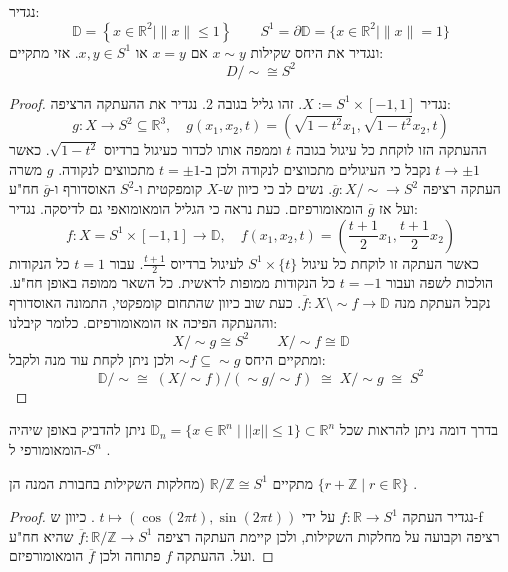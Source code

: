 \documentclass{tstextbook}
\begin{document}
\begin{example}
נגדיר:
$$\mathbb{D}=\left\{ x\in\mathbb{R}^{2}\mid\|x\|\le1 \right\}\qquad S^{1}=\partial\mathbb{D}=\{x\in\mathbb{R}^{2}\mid\|x\|=1\}$$
ונגדיר את היחס שקילות \(x \sim y\) אם \(x =y\) או \(x,y \in S^{1}\). אזי מתקיים:
$$D / \sim \cong  S^{2}$$

\end{example}
\begin{proof}
נגדיר \(X:=S^{1}\times[-1,1]\). זהו גליל בגובה 2. נגדיר את ההעתקה הרציפה:
$$g:X\to S^{2}\subseteq\mathbb{R}^{3},\quad g(x_{1},x_{2},t)=({\sqrt{1-t^{2}}}x_{1},{\sqrt{1-t^{2}}}x_{2},t)$$
ההעתקה הזו לוקחת כל עיגול בגובה \(t\) וממפה אותו לכדור כעיגול ברדיוס \(\sqrt{ 1-t^{2} }\). כאשר \(t\to \pm 1\) נקבל כי העיגולים מתכווצים לנקודה ולכן ב-\(t=\pm 1\) מתכווצים לנקודה. \(g\) משרה העתקה רציפה \(\overline{g}:X / \sim\to S^{2}\). נשים לב כי כיוון ש-\(X\) קומפקטית ו-\(S^{2}\) האוסדורף ו-\(\overline{g}\) חח"ע ועל אז \(\overline{g}\) הומאומורפיזם. כעת נראה כי הגליל הומאומואפי גם לדיסקה. נגדיר:
$$f:X=S^{1}\times[-1,1]\to\mathbb{D},\quad f(x_{1},x_{2},t)=\left({\frac{t+1}{2}}x_{1},{\frac{t+1}{2}}x_{2}\right)$$
כאשר העתקה זו לוקחת כל עיגול \(S^{1}\times \{ t \}\) לעיגול ברדיוס \(\frac{t+1}{2}\). עבור \(t=1\) כל הנקודות הולכות לשפה ועבור \(t=-1\) כל הנקודות ממופות לראשית. כל השאר ממופה באופן חח"ע. נקבל העתקת מנה \(\overline{f}:X \setminus \sim f\to\mathbb{D}\). כעת שוב כיוון שהתחום קומפקטי, התמונה האוסדורף וההעתקה הפיכה אז הומאומורפיזם. כלומר קיבלנו:
$$X / \sim g\cong  S^{2}\qquad X / \sim f \cong  \mathbb{D} $$
ומתקיים היחס \(\sim f \subseteq \sim g\) ולכן ניתן לקחת עוד מנה ולקבל:
$$\mathbb{D}/\sim\cong\;(X/\sim f)/(\sim g/\sim f)\;\cong\;X/\sim g\;\cong\;S^{2}$$

\end{proof}
\begin{remark}
בדרך דומה ניתן להראות שכל \(\mathbb{D}_{n}=\{x\in\mathbb{R}^{n} \mid ||x||\le1\}\subset\mathbb{R}^{n}\) ניתן להדביק באופן שיהיה הומאומורפי ל-\(S^n\) .

\end{remark}
\begin{proposition}
מתקיים \(\mathbb{R}/\mathbb{Z}\cong S^{1}\) (מחלקות השקילות בחבורת המנה הן \(\{r+\mathbb{Z} \mid r\in\mathbb{R}\}\) .

\end{proposition}
\begin{proof}
נגדיר העתקה \(f:\mathbb{R}\rightarrow S^{1}\) על ידי \(t\mapsto(\cos(2\pi t),\sin(2\pi t))\) .
כיוון ש-f רציפה וקבועה על מחלקות השקילות, ולכן קיימת העתקה רציפה \(\overline{f}:\mathbb{R}/\mathbb{Z}\rightarrow S^{1}\) שהיא חח"ע ועל. ההעתקה \(f\) פתוחה ולכן \(\overline{f}\) הומאומורפיזם.

\end{proof}
\end{document}
